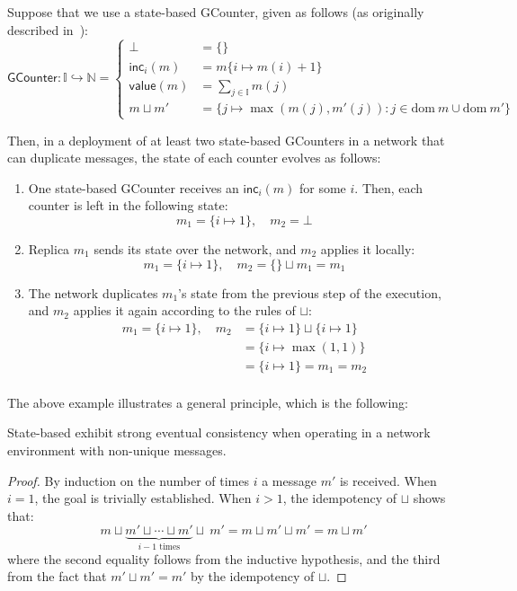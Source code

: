 \begin{example}
  Suppose that we use a state-based GCounter, given as follows (as originally
  described in~\citep{almedia18}):
  \[
    \mathsf{GCounter}
      : \mathbb{I} \hookrightarrow \mathbb{N}
      = \left\{
          \begin{aligned}
            \bot &= \{\} \\
            \mathsf{inc}_i(m) &= m\{ i \mapsto m(i) + 1 \} \\
            \mathsf{value}(m) &= \sum_{j \in \mathbb{I}} m(j) \\
            m \sqcup m' &= \{
              j \mapsto \max(m(j), m'(j)) :
              j \in \mathrm{dom}~m \cup \mathrm{dom}~m'
            \}
          \end{aligned}
        \right.
  \]

  Then, in a deployment of at least two state-based GCounters in a network that
  can duplicate messages, the state of each counter evolves as follows:
  \begin{enumerate}
    \item One state-based GCounter receives an $\mathsf{inc}_i(m)$ for some $i$.
      Then, each counter is left in the following state:
      \[
        m_1 = \{ i \mapsto 1 \},\quad
        m_2 = \bot
      \]
    \item Replica $m_1$ sends its state over the network, and $m_2$ applies it
      locally:
      \[
        m_1 = \{ i \mapsto 1 \},\quad
        m_2 = \{\} \sqcup m_1 = m_1
      \]
    \item The network duplicates $m_1$'s state from the previous step of the
      execution, and $m_2$ applies it again according to the rules of $\sqcup$:
      \[
        \begin{aligned}
          m_1 = \{ i \mapsto 1 \},\quad
          m_2
            &= \{ i \mapsto 1 \} \sqcup \{ i \mapsto 1 \} \\
            &= \{ i \mapsto \max(1, 1) \} \\
            &= \{ i \mapsto 1 \} = m_1 = m_2 \\
        \end{aligned}
      \]
  \end{enumerate}
\end{example}

The above example illustrates a general principle, which is the following:
\begin{theorem} \label{thm:state-sec-dup}
  State-based \CRDTs exhibit strong eventual consistency when operating in a
  network environment with non-unique messages.
\end{theorem}
\begin{proof}
  By induction on the number of times $i$ a message $m'$ is received. When $i =
  1$, the goal is trivially established. When $i > 1$, the idempotency of
  $\sqcup$ shows that:
  \[
    m \sqcup \underbrace{m' \sqcup \cdots \sqcup m'}_{\text{$i-1$ times}} \sqcup~m'
      = m \sqcup m' \sqcup m'
      = m \sqcup m'
  \]
  where the second equality follows from the inductive hypothesis, and the third
  from the fact that $m' \sqcup m' = m'$ by the idempotency of $\sqcup$.
\end{proof}

